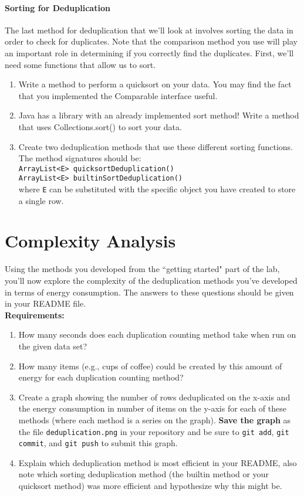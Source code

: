 \documentclass[12pt]{article}
\begin{document}
\paragraph{Sorting for Deduplication}
The last method for deduplication that we'll look at involves sorting the data in order to check for duplicates.  Note that the comparison method you use will play an important role in determining if you correctly find the duplicates.  First, we'll need some functions that allow us to sort.

\begin{enumerate}[start=3]
\item Write a method to perform a quicksort on your data.  You may find the fact that you implemented the Comparable interface useful.
\item Java has a library with an already implemented sort method!  Write a method that uses Collections.sort() to sort your data.
\item Create two deduplication methods that use these different sorting functions.  The method signatures should be:\\
\verb+ArrayList<E> quicksortDeduplication()+\\
\verb+ArrayList<E> builtinSortDeduplication()+\\
where \verb+E+ can be substituted with the specific object you have created to store a single row.
\end{enumerate}

\section{Complexity Analysis}

Using the methods you developed from the ``getting started" part of the lab, you'll now explore the complexity of the deduplication methods you've developed in terms of energy consumption.  The answers to these questions should be given in your README file.\\

\textbf{Requirements:}
\begin{enumerate}
\item How many seconds does each duplication counting method take when run on the given data set?
\item How many items (e.g., cups of coffee) could be created by this amount of energy for each duplication counting method?
\item Create a graph showing the number of rows deduplicated on the x-axis and the energy consumption in number of items on the y-axis for each of these methods (where each method is a series on the graph).  \textbf{Save the graph} as the file \texttt{deduplication.png} in your repository and be sure to \verb+git add+, \verb+git commit+, and \verb+git push+ to submit this graph.
\item Explain which deduplication method is most efficient in your README, also note which sorting deduplication method (the builtin method or your quicksort method) was more efficient and hypothesize why this might be.
\end{enumerate}
\end{document}

